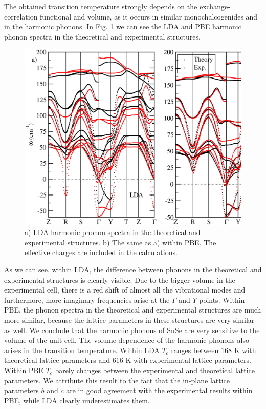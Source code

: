 The obtained transition temperature strongly depends on the exchange-correlation functional and volume, as it occurs 
in similar monochalcogenides\cite{ribeiro2018strong} and in the harmonic phonons.
In Fig. \ref{harmonic-volume} we can see the LDA and PBE harmonic phonon spectra in the theoretical and experimental 
structures.
\begin{figure}[th]
\begin{center}
\includegraphics[width=0.9\linewidth]{Figures/phonon-exp-dft.eps}
\caption[Harmonic phonons of $Cmcm$ SnSe with different volumes.]{a) LDA harmonic phonon spectra in the theoretical
and experimental structures. b) The same as a) within PBE. The effective charges are included in the calculations.}
\label{harmonic-volume}
\end{center}
\end{figure}
As we can see, within LDA, the difference between phonons in the theoretical and experimental structures is clearly
visible. Due to the bigger volume in the experimental cell, there is a red shift of almost all the vibrational modes
and furthermore, more imaginary frequencies arise at the $\Gamma$ and $Y$ points. Within PBE, the phonon spectra in
the theoretical and experimental structures are much more similar, because the lattice parameters in these structures
are very similar as well. We conclude that the harmonic phonons of SnSe are very sensitive to the volume of the unit 
cell. The volume dependence of the harmonic phonons also arises in the transition temperature. Within LDA $T_{c}$ 
ranges between $168$ K with theoretical lattice parameters and $616$ K with experimental lattice parameters. Within 
PBE $T_{c}$ barely changes between the experimental and theoretical lattice parameters. We attribute this result to 
the fact that the in-plane lattice parameters $b$ and $c$ are in good agreement with the experimental results within 
PBE, while LDA clearly underestimates them. \\

